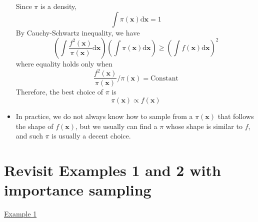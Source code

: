 \documentclass[12pt]{article}
\begin{document}
\begin{itemize}
	Since $\pi$ is a density,
	$$
	\int \pi(\bm{x})\textrm{d}\bm{x}=1
	$$
	By Cauchy-Schwartz inequality, we have
	$$
	\left(\int \frac{f^2(\bm{x})}{\pi(\bm{x})}\textrm{d}\bm{x}\right)\left(\int \pi(\bm{x})\textrm{d}\bm{x}\right) \geq \left( \int f(\bm{x})\textrm{d}\bm{x} \right)^2
	$$
	where equality holds only when
	$$
	\frac{f^2(\bm{x})}{\pi(\bm{x})} \Big/ \pi(\bm{x}) = \textrm{Constant}
	$$
	Therefore, the best choice of $\pi$ is
	$$
	\pi(\bm{x})\propto f(\bm{x})
	$$
	\item In practice, we do not always know how to sample from a $\pi(\bm{x})$ that follows the shape of $f(\bm{x})$, but we usually can find a $\pi$ whose shape is similar to $f$, and such $\pi$ is usually a decent choice.
\end{itemize}



\section{Revisit Examples 1 and 2 with importance sampling}

\underline{Example 1}
\end{document}
